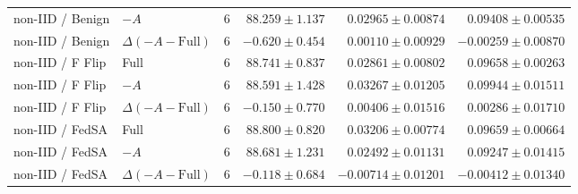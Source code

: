 \begin{table}[t]
\begin{tabular}{llrrrr}
non-IID / Benign & $-A$ & 6 & $88.259 \pm 1.137$ & $0.02965 \pm 0.00874$ & $0.09408 \pm 0.00535$ \\
non-IID / Benign & $\Delta(-A-\mathrm{Full})$ & 6 & $-0.620 \pm 0.454$ & $0.00110 \pm 0.00929$ & $-0.00259 \pm 0.00870$ \\
non-IID / F Flip & Full & 6 & $88.741 \pm 0.837$ & $0.02861 \pm 0.00802$ & $0.09658 \pm 0.00263$ \\
non-IID / F Flip & $-A$ & 6 & $88.591 \pm 1.428$ & $0.03267 \pm 0.01205$ & $0.09944 \pm 0.01511$ \\
non-IID / F Flip & $\Delta(-A-\mathrm{Full})$ & 6 & $-0.150 \pm 0.770$ & $0.00406 \pm 0.01516$ & $0.00286 \pm 0.01710$ \\
non-IID / FedSA & Full & 6 & $88.800 \pm 0.820$ & $0.03206 \pm 0.00774$ & $0.09659 \pm 0.00664$ \\
non-IID / FedSA & $-A$ & 6 & $88.681 \pm 1.231$ & $0.02492 \pm 0.01131$ & $0.09247 \pm 0.01415$ \\
non-IID / FedSA & $\Delta(-A-\mathrm{Full})$ & 6 & $-0.118 \pm 0.684$ & $-0.00714 \pm 0.01201$ & $-0.00412 \pm 0.01340$ \\
\bottomrule
\end{tabular}
\end{table}

